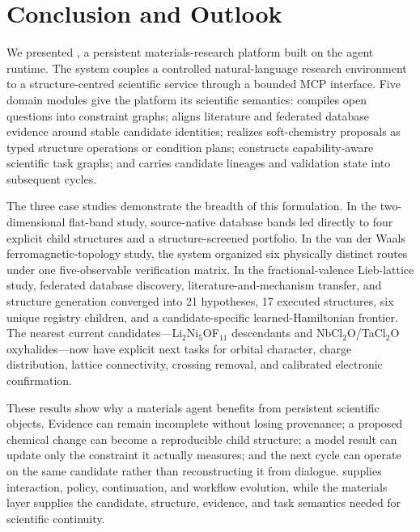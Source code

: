 \section{Conclusion and Outlook}
\label{sec:conclusion}

We presented \system, a persistent materials-research platform built on the \hermes agent runtime.  The system couples a controlled natural-language research environment to a structure-centred scientific service through a bounded MCP interface.  Five domain modules give the platform its scientific semantics: \matspec compiles open questions into constraint graphs; \matevidence aligns literature and federated database evidence around stable candidate identities; \mattransform realizes soft-chemistry proposals as typed structure operations or condition plans; \matdag constructs capability-aware scientific task graphs; and \matevolve carries candidate lineages and validation state into subsequent cycles.

The three case studies demonstrate the breadth of this formulation.  In the two-dimensional flat-band study, source-native database bands led directly to four explicit child structures and a structure-screened portfolio.  In the van der Waals ferromagnetic-topology study, the system organized six physically distinct routes under one five-observable verification matrix.  In the fractional-valence Lieb-lattice study, federated database discovery, literature-and-mechanism transfer, and structure generation converged into 21 hypotheses, 17 executed structures, six unique registry children, and a candidate-specific learned-Hamiltonian frontier.  The nearest current candidates---Li$_2$Ni$_5$OF$_{11}$ descendants and NbCl$_2$O/TaCl$_2$O oxyhalides---now have explicit next tasks for orbital character, charge distribution, lattice connectivity, crossing removal, and calibrated electronic confirmation.

These results show why a materials agent benefits from persistent scientific objects.  Evidence can remain incomplete without losing provenance; a proposed chemical change can become a reproducible child structure; a model result can update only the constraint it actually measures; and the next cycle can operate on the same candidate rather than reconstructing it from dialogue.  \hermes supplies interaction, policy, continuation, and workflow evolution, while the materials layer supplies the candidate, structure, evidence, and task semantics needed for scientific continuity.

